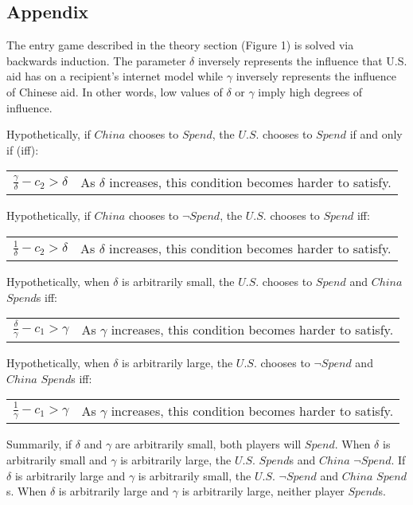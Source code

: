 \subsection*{Appendix}
The entry game described in the theory section (Figure 1) is solved via backwards induction. The parameter $\delta$ inversely represents the influence that U.S. aid has on a recipient's internet model while $\gamma$ inversely represents the influence of Chinese aid. In other words, low values of $\delta$ or $\gamma$ imply high degrees of influence. 

Hypothetically, if $China$ chooses to $Spend$, the $U.S.$ chooses to $Spend$ if and only if (iff):

\begin{tabular}{c l}
    $\frac{\gamma}{\delta}-c_2> \delta$ &  As $\delta$ increases, this condition becomes harder to satisfy.\\
\end{tabular}

Hypothetically, if $China$ chooses to $\neg Spend$, the $U.S.$ chooses to $Spend$ iff:

\begin{tabular}{c l}
    $\frac{1}{\delta}-c_2> \delta$ &  As $\delta$ increases, this condition becomes harder to satisfy.\\
\end{tabular}

Hypothetically, when $\delta$ is arbitrarily small, the $U.S.$ chooses to $Spend$ and $China$ $Spend$s iff:

\begin{tabular}{c l}
    $\frac{\delta}{\gamma}-c_1> \gamma$ &  As $\gamma$ increases, this condition becomes harder to satisfy.\\
\end{tabular}

Hypothetically, when $\delta$ is arbitrarily large, the $U.S.$ chooses to $\neg Spend$ and $China$ $Spend$s iff:

\begin{tabular}{c l}
    $\frac{1}{\gamma}-c_1> \gamma$ &  As $\gamma$ increases, this condition becomes harder to satisfy.\\
\end{tabular}

Summarily, if $\delta$ and $\gamma$ are arbitrarily small, both players will $Spend$. When $\delta$ is arbitrarily small and $\gamma$ is arbitrarily large, the $U.S.$ $Spend$s and $China$ $\neg Spend$. If $\delta$ is arbitrarily large and $\gamma$ is arbitrarily small, the $U.S.$ $\neg Spend$ and $China$ $Spend$s. When $\delta$ is arbitrarily large and $\gamma$ is arbitrarily large, neither player $Spend$s.

